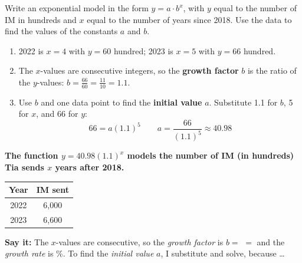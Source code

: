 \begin{minipage}[t]{0.62\textwidth}
\vspace{0pt}
Write an exponential model in the form $y=a\cdot b^x$, with $y$ equal to the number of IM in hundreds and $x$ equal to the number of years since 2018. Use the data to find the values of the constants $a$ and $b$.
\begin{enumerate}[label=\textbf{\arabic*.}, itemsep=3pt]
\item 2022 is $x=4$ with $y=60$ hundred; 2023 is $x=5$ with $y=66$ hundred.
\item The $x$-values are consecutive integers, so the \textbf{growth factor} $b$ is the ratio of the $y$-values: $b=\frac{66}{60}=\frac{11}{10}=1.1$.
\item Use $b$ and one data point to find the \textbf{initial value} $a$. Substitute 1.1 for $b$, 5 for $x$, and 66 for $y$:
\[66=a(1.1)^5\qquad a=\frac{66}{(1.1)^5}\approx40.98\]
\end{enumerate}
\textbf{The function $y=40.98(1.1)^x$ models the number of IM (in hundreds) Tia sends $x$ years after 2018.}
\end{minipage}\hfill
\begin{minipage}[t]{0.34\textwidth}
\vspace{0pt}
{\centering\small
\begin{tabular}{|c|c|}
\hline
\textbf{Year} & \textbf{IM sent} \\ \hline
2022 & 6,000 \\
2023 & 6,600 \\ \hline
\end{tabular}\par}

\vspace{6pt}

\vspace{6pt}
\end{minipage}

\textbf{Say it:} The $x$-values are consecutive, so the \emph{growth factor} is $b=$ \blank[1.6cm] $=$ \blank[1.2cm] and the \emph{growth rate} is \blank[1.2cm]\%. To find the \emph{initial value} $a$, I substitute \blank[2.4cm] and solve, because \dots\lines[1]

